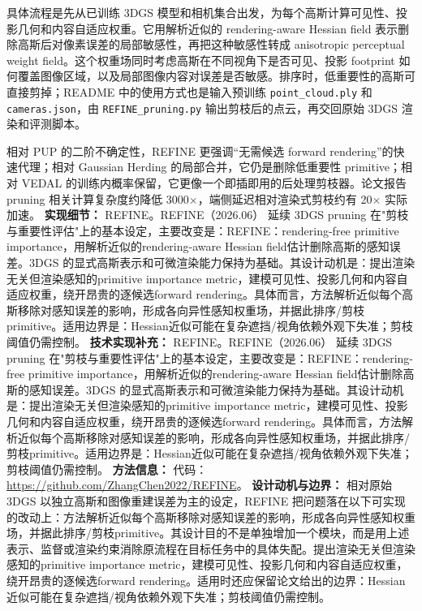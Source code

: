 具体流程是先从已训练 3DGS 模型和相机集合出发，为每个高斯计算可见性、投影几何和内容自适应权重。它用解析近似的 rendering-aware Hessian field 表示删除高斯后对像素误差的局部敏感性，再把这种敏感性转成 anisotropic perceptual weight field。这个权重场同时考虑高斯在不同视角下是否可见、投影 footprint 如何覆盖图像区域，以及局部图像内容对误差是否敏感。排序时，低重要性的高斯可直接剪掉；README 中的使用方式也是输入预训练 \texttt{point\_cloud.ply} 和 \texttt{cameras.json}，由 \texttt{REFINE\_pruning.py} 输出剪枝后的点云，再交回原始 3DGS 渲染和评测脚本。

相对 PUP 的二阶不确定性，REFINE 更强调“无需候选 forward rendering”的快速代理；相对 Gaussian Herding 的局部合并，它仍是删除低重要性 primitive；相对 VEDAL 的训练内概率保留，它更像一个即插即用的后处理剪枝器。论文报告 pruning 相关计算复杂度约降低 3000$\times$，端侧延迟相对渲染式剪枝约有 20$\times$ 实际加速。
\textbf{实现细节：} REFINE。REFINE（2026.06） 延续 3DGS pruning 在"剪枝与重要性评估"上的基本设定，主要改变是：REFINE：rendering-free primitive importance，用解析近似的rendering-aware Hessian field估计删除高斯的感知误差。3DGS 的显式高斯表示和可微渲染能力保持为基础。其设计动机是：提出渲染无关但渲染感知的primitive importance metric，建模可见性、投影几何和内容自适应权重，绕开昂贵的逐候选forward rendering。具体而言，方法解析近似每个高斯移除对感知误差的影响，形成各向异性感知权重场，并据此排序/剪枝primitive。适用边界是：Hessian近似可能在复杂遮挡/视角依赖外观下失准；剪枝阈值仍需控制。
\textbf{技术实现补充：} REFINE。REFINE（2026.06） 延续 3DGS pruning 在"剪枝与重要性评估"上的基本设定，主要改变是：REFINE：rendering-free primitive importance，用解析近似的rendering-aware Hessian field估计删除高斯的感知误差。3DGS 的显式高斯表示和可微渲染能力保持为基础。其设计动机是：提出渲染无关但渲染感知的primitive importance metric，建模可见性、投影几何和内容自适应权重，绕开昂贵的逐候选forward rendering。具体而言，方法解析近似每个高斯移除对感知误差的影响，形成各向异性感知权重场，并据此排序/剪枝primitive。适用边界是：Hessian近似可能在复杂遮挡/视角依赖外观下失准；剪枝阈值仍需控制。
\textbf{方法信息：} 代码：\url{https://github.com/ZhangChen2022/REFINE}。
\textbf{设计动机与边界：} 相对原始 3DGS 以独立高斯和图像重建误差为主的设定，REFINE 把问题落在以下可实现的改动上：方法解析近似每个高斯移除对感知误差的影响，形成各向异性感知权重场，并据此排序/剪枝primitive。其设计目的不是单独增加一个模块，而是用上述表示、监督或渲染约束消除原流程在目标任务中的具体失配。提出渲染无关但渲染感知的primitive importance metric，建模可见性、投影几何和内容自适应权重，绕开昂贵的逐候选forward rendering。适用时还应保留论文给出的边界：Hessian近似可能在复杂遮挡/视角依赖外观下失准；剪枝阈值仍需控制。

